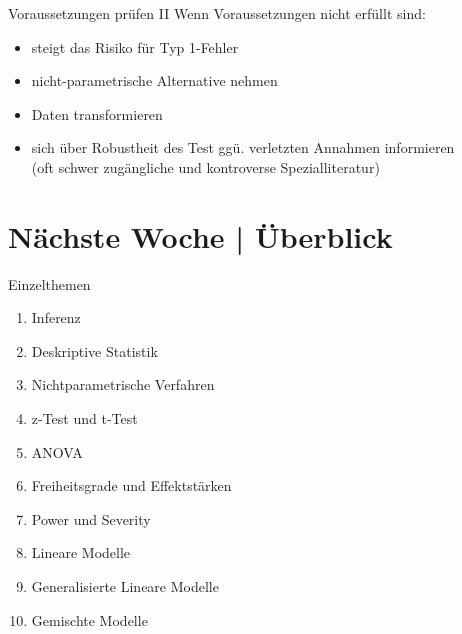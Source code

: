 \begin{frame}
  {Voraussetzungen prüfen II}
  Wenn Voraussetzungen nicht erfüllt sind:
  \begin{itemize}[<+->]
    \item steigt das Risiko für Typ 1-Fehler
    \item nicht-parametrische Alternative nehmen
    \item Daten transformieren
    \item sich über Robustheit des Test ggü. verletzten Annahmen informieren\\
      (oft schwer zugängliche und kontroverse Spezialliteratur)
  \end{itemize}
\end{frame}


\ifdefined\TITLE
  \section{Nächste Woche | Überblick}

  \begin{frame}
    {Einzelthemen}
    \begin{enumerate}
      \item Inferenz
      \item Deskriptive Statistik
      \item Nichtparametrische Verfahren
      \item z-Test und t-Test
      \item \alert{ANOVA}
      \item Freiheitsgrade und Effektstärken
      \item Power und Severity
      \item Lineare Modelle
      \item Generalisierte Lineare Modelle
      \item Gemischte Modelle
    \end{enumerate}
  \end{frame}
\fi

